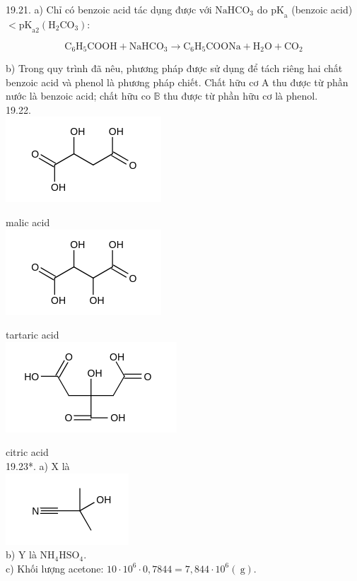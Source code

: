 \documentclass[10pt]{article}
\begin{document}
19.21. a) Chỉ có benzoic acid tác dụng được với $\mathrm{NaHCO}_{3}$ do $\mathrm{pK}_{\mathrm{a}}$ (benzoic acid) $<\mathrm{pK}_{\mathrm{a} 2}\left(\mathrm{H}_{2} \mathrm{CO}_{3}\right):$

$$
\mathrm{C}_{6} \mathrm{H}_{5} \mathrm{COOH}+\mathrm{NaHCO}_{3} \rightarrow \mathrm{C}_{6} \mathrm{H}_{5} \mathrm{COONa}+\mathrm{H}_{2} \mathrm{O}+\mathrm{CO}_{2}
$$

b) Trong quy trình đã nêu, phương pháp được sử dụng để tách riêng hai chất benzoic acid và phenol là phương pháp chiết. Chất hữu cơ A thu được từ phần nước là benzoic acid; chất hữu co $\mathbb{B}$ thu được từ phần hữu cơ là phenol.\\
19.22.\\
\includegraphics{smile-93d285dd2c97d1c5e4c4b05dbcf44b586dcca220}

malic acid\\
\includegraphics{smile-7bec4bc3248442b90f6ff7e03be18c017abafe98}

tartaric acid\\
\includegraphics{smile-b5d5d36a8a51bfdedf51c7df504ad53d81b7b0d2}

citric acid\\
19.23*. a) X là\\
\includegraphics{smile-952464a1491d85cd4b7c5233884a3fdd1e0dd007}\\
b) Y là $\mathrm{NH}_{4} \mathrm{HSO}_{4}$.\\
c) Khối lượng acetone: $10 \cdot 10^{6} \cdot 0,7844=7,844 \cdot 10^{6}(\mathrm{~g})$.
\end{document}
